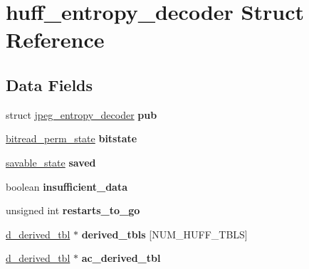 \hypertarget{structhuff__entropy__decoder}{}\section{huff\+\_\+entropy\+\_\+decoder Struct Reference}
\label{structhuff__entropy__decoder}
\subsection*{Data Fields}
\begin{DoxyCompactItemize}
\item 
\mbox{\label{structhuff__entropy__decoder_a409cf5f871f45956e45ccd51d9c13e2e}} 
struct \hyperlink{structjpeg__entropy__decoder}{jpeg\+\_\+entropy\+\_\+decoder} {\bfseries pub}
\item 
\mbox{\label{structhuff__entropy__decoder_ac2839688797b82af32f7fe83f15f869d}} 
\hyperlink{structbitread__perm__state}{bitread\+\_\+perm\+\_\+state} {\bfseries bitstate}
\item 
\mbox{\label{structhuff__entropy__decoder_a3e23b9b8db37a99cddd58f23cf54ebb0}} 
\hyperlink{structsavable__state}{savable\+\_\+state} {\bfseries saved}
\item 
\mbox{\label{structhuff__entropy__decoder_af6648338b641e6e601594b1e37da1be2}} 
boolean {\bfseries insufficient\+\_\+data}
\item 
\mbox{\label{structhuff__entropy__decoder_a50bb63b0114a26bccea7f609f1eb0d28}} 
unsigned int {\bfseries restarts\+\_\+to\+\_\+go}
\item 
\mbox{\label{structhuff__entropy__decoder_ab4c9927c62b1261782176bcefbaff4e9}} 
\hyperlink{structd__derived__tbl}{d\+\_\+derived\+\_\+tbl} $\ast$ {\bfseries derived\+\_\+tbls} \mbox{[}N\+U\+M\+\_\+\+H\+U\+F\+F\+\_\+\+T\+B\+LS\mbox{]}
\item 
\mbox{\label{structhuff__entropy__decoder_a580d076512db8e072e9a7ce94cb6564a}} 
\hyperlink{structd__derived__tbl}{d\+\_\+derived\+\_\+tbl} $\ast$ {\bfseries ac\+\_\+derived\+\_\+tbl}

\end{DoxyCompactItemize}
